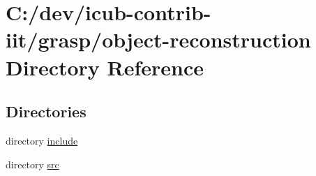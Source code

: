 \section{C\+:/dev/icub-\/contrib-\/iit/grasp/object-\/reconstruction Directory Reference}
\label{dir_cf541e139d6cd885425f90aeafb6e4ea}
\subsection*{Directories}
\begin{DoxyCompactItemize}
\item 
directory \hyperlink{dir_0e496b94e65178671688c5163a0d89fe}{include}
\item 
directory \hyperlink{dir_b6dfd752f58c36a18e052c8ce1474b27}{src}
\end{DoxyCompactItemize}
